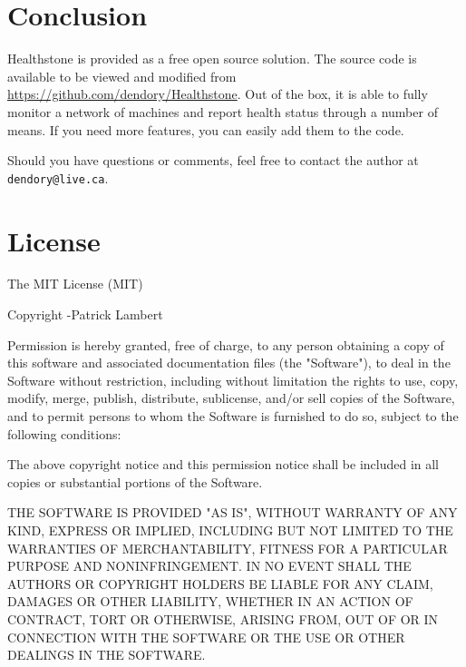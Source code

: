 \documentclass[11pt]{article}
\begin{document}
\section{Conclusion}

Healthstone is provided as a free open source solution. The source code is available to be viewed and modified from \url{https://github.com/dendory/Healthstone}. Out of the box, it is able to fully monitor a network of machines and report health status through a number of means. If you need more features, you can easily add them to the code.

Should you have questions or comments, feel free to contact the author at \texttt{dendory@live.ca}.

\section{License}
The MIT License (MIT)

Copyright \textcopyright {}-\the\year \thinspace Patrick Lambert

Permission is hereby granted, free of charge, to any person obtaining a copy
of this software and associated documentation files (the "Software"), to deal
in the Software without restriction, including without limitation the rights
to use, copy, modify, merge, publish, distribute, sublicense, and/or sell
copies of the Software, and to permit persons to whom the Software is
furnished to do so, subject to the following conditions:

The above copyright notice and this permission notice shall be included in
all copies or substantial portions of the Software.

THE SOFTWARE IS PROVIDED "AS IS", WITHOUT WARRANTY OF ANY KIND, EXPRESS OR
IMPLIED, INCLUDING BUT NOT LIMITED TO THE WARRANTIES OF MERCHANTABILITY,
FITNESS FOR A PARTICULAR PURPOSE AND NONINFRINGEMENT. IN NO EVENT SHALL THE
AUTHORS OR COPYRIGHT HOLDERS BE LIABLE FOR ANY CLAIM, DAMAGES OR OTHER
LIABILITY, WHETHER IN AN ACTION OF CONTRACT, TORT OR OTHERWISE, ARISING FROM,
OUT OF OR IN CONNECTION WITH THE SOFTWARE OR THE USE OR OTHER DEALINGS IN
THE SOFTWARE.
\end{document}
